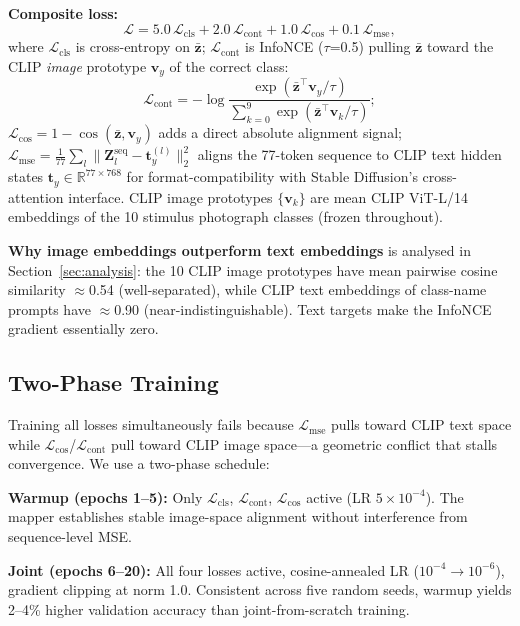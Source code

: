 \documentclass{article}
\begin{document}
\textbf{Composite loss:}
\begin{equation}
  \mathcal{L} = 5.0\,\mathcal{L}_\mathrm{cls} + 2.0\,\mathcal{L}_\mathrm{cont} + 1.0\,\mathcal{L}_\mathrm{cos} + 0.1\,\mathcal{L}_\mathrm{mse},
\end{equation}
where $\mathcal{L}_\mathrm{cls}$ is cross-entropy on $\bar{\mathbf{z}}$; $\mathcal{L}_\mathrm{cont}$ is InfoNCE ($\tau$=0.5) pulling $\bar{\mathbf{z}}$ toward the CLIP \emph{image} prototype $\mathbf{v}_y$ of the correct class:
\begin{equation}
  \mathcal{L}_\mathrm{cont} = -\log\frac{\exp(\bar{\mathbf{z}}^\top\mathbf{v}_y/\tau)}{\sum_{k=0}^{9}\exp(\bar{\mathbf{z}}^\top\mathbf{v}_k/\tau)};
\end{equation}
$\mathcal{L}_\mathrm{cos} = 1 - \cos(\bar{\mathbf{z}},\mathbf{v}_y)$ adds a direct absolute alignment signal; $\mathcal{L}_\mathrm{mse} = \frac{1}{77}\sum_{l}\|\mathbf{Z}^{\text{seq}}_l - \mathbf{t}_y^{(l)}\|_2^2$ aligns the 77-token sequence to CLIP text hidden states $\mathbf{t}_y\in\mathbb{R}^{77\times768}$ for format-compatibility with Stable Diffusion's cross-attention interface. CLIP image prototypes $\{\mathbf{v}_k\}$ are mean CLIP ViT-L/14 embeddings of the 10 stimulus photograph classes (frozen throughout).

\textbf{Why image embeddings outperform text embeddings} is analysed in Section~\ref{sec:analysis}: the 10 CLIP image prototypes have mean pairwise cosine similarity $\approx$0.54 (well-separated), while CLIP text embeddings of class-name prompts have $\approx$0.90 (near-indistinguishable). Text targets make the InfoNCE gradient essentially zero.

\subsection{Two-Phase Training}
\label{sec:training}

Training all losses simultaneously fails because $\mathcal{L}_\mathrm{mse}$ pulls toward CLIP text space while $\mathcal{L}_\mathrm{cos}$/$\mathcal{L}_\mathrm{cont}$ pull toward CLIP image space---a geometric conflict that stalls convergence. We use a two-phase schedule:

\textbf{Warmup (epochs 1--5):} Only $\mathcal{L}_\mathrm{cls}$, $\mathcal{L}_\mathrm{cont}$, $\mathcal{L}_\mathrm{cos}$ active (LR $5\times10^{-4}$). The mapper establishes stable image-space alignment without interference from sequence-level MSE.

\textbf{Joint (epochs 6--20):} All four losses active, cosine-annealed LR ($10^{-4}{\to}10^{-6}$), gradient clipping at norm 1.0. Consistent across five random seeds, warmup yields 2--4\% higher validation accuracy than joint-from-scratch training.
\end{document}
